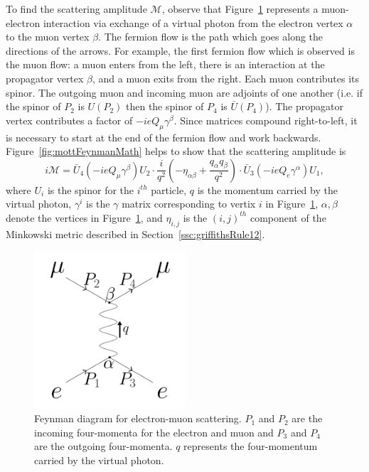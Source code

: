 To find the scattering amplitude $\mathcal{M}$, observe that Figure~\ref{fig:mottFeynman} represents a muon-electron interaction via exchange of a virtual photon from the electron vertex $\alpha$ to the muon vertex $\beta$. The fermion flow is the path which goes along the directions of the arrows. For example, the first fermion flow which is observed is the muon flow: a muon enters from the left, there is an interaction at the propagator vertex $\beta$, and a muon exits from the right. Each muon contributes its spinor. The outgoing muon and incoming muon are adjoints of one another (i.e. if the spinor of $P_2$ is $U(P_2)$ then the spinor of $P_4$ is $\bar{U}(P_4)$). The propagator vertex contributes a factor of $-ieQ_\mu\gamma^\beta$. Since matrices compound right-to-left, it is necessary to start at the end of the fermion flow and work backwards. Figure~\ref{fig:mottFeynmanMath} helps to show that the scattering amplitude is
\begin{equation} \label{eqn:mottFeynmanScatteringAmplitude}
i\mathcal{M}=\bar{U}_4(-ieQ_\mu\gamma^\beta)U_2\cdot\frac{i}{q^2}(-\eta_{\alpha\beta}+\frac{q_\alpha q_\beta}{q^2})\cdot\bar{U}_3(-ieQ_e\gamma^\alpha)U_1,
\end{equation}
where $U_i$ is the spinor for the $i^{th}$ particle, $q$ is the momentum carried by the virtual photon, $\gamma^i$ is the $\gamma$ matrix corresponding to vertix $i$ in Figure~\ref{fig:mottFeynman}, $\alpha,\beta$ denote the vertices in Figure~\ref{fig:mottFeynman}, and $\eta_{i,j}$ is the $(i,j)^{th}$ component of the Minkowski metric described in Section~\ref{ssc:griffithsRule12}.

\begin{figure}
  \centering
    \includegraphics[width=0.5\textwidth]{Figures/MottFeynman} 
  \caption[Feynman diagram for electron-muon scattering.]{Feynman diagram for electron-muon scattering. $P_1$ and $P_2$ are the incoming four-momenta for the electron and muon and $P_3$ and $P_4$ are the outgoing four-momenta. $q$ represents the four-momentum carried by the virtual photon.}
  \label{fig:mottFeynman}
\end{figure}

